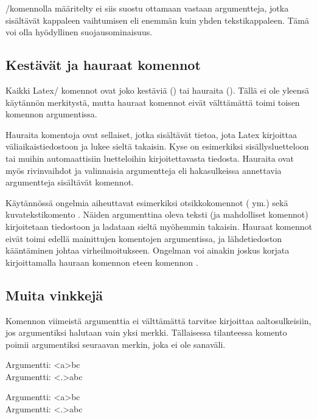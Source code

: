 \-/komennolla määritelty  ei siis
suostu ottamaan vastaan argumentteja, jotka sisältävät kappaleen
vaihtumisen eli enemmän kuin yhden tekstikappaleen. Tämä voi olla
hyödyllinen suojausominaisuus.

\subsection{Kestävät ja hauraat komennot}
\label{luku/komennot-hauraat}

Kaikki Latex\-/ komennot ovat joko kestäviä () tai
hauraita (). Tällä ei ole yleensä käytännön
merkitystä, mutta hauraat komennot eivät välttämättä toimi toisen
komennon argumentissa.

Hauraita komentoja ovat sellaiset, jotka sisältävät tietoa, jota Latex
kirjoittaa väliaikaistiedostoon ja lukee sieltä takaisin. Kyse on
esimerkiksi sisällysluetteloon tai muihin automaattisiin luetteloihin
kirjoitettavasta tiedosta. Hauraita ovat myös rivinvaihdot ja
valinnaisia argumentteja eli hakasulkeissa annettavia argumentteja
sisältävät komennot.

Käytännössä ongelmia aiheuttavat esimerkiksi otsikkokomennot
( ym.) sekä kuvatekstikomento . Näiden
argumenttina oleva teksti (ja mahdolliset komennot) kirjoitetaan
tiedostoon ja ladataan sieltä myöhemmin takaisin. Hauraat komennot eivät
toimi edellä mainittujen komentojen argumentissa, ja lähdetiedoston
kääntäminen johtaa virheilmoitukseen. Ongelman voi ainakin joskus
korjata kirjoittamalla hauraan komennon eteen komennon
.

\subsection{Muita vinkkejä}

Komennon viimeistä argumenttia ei välttämättä tarvitse kirjoittaa
aaltosulkeisiin, jos argumentiksi halutaan vain yksi merkki. Tällaisessa
tilanteessa komento poimii argumentiksi seuraavan merkin, joka ei ole
sanaväli.

\begin{koodilohkosis}
\newcommand{\x}[1]{Argumentti: <#1>}
\x abc \\
\x.abc
\end{koodilohkosis}

\begin{tulossis}
  Argumentti: <a>bc \\
  Argumentti: <.>abc
\end{tulossis}

